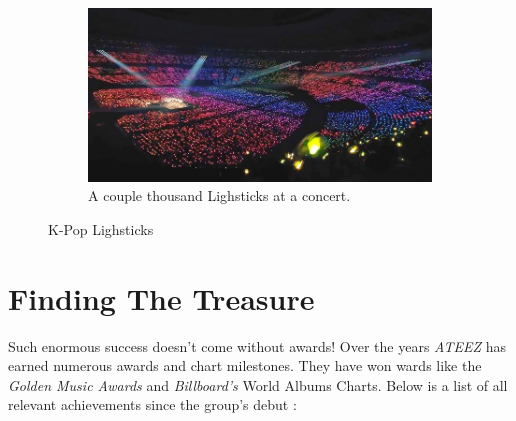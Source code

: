 \documentclass[a4paper,12pt]{article}
\begin{document}
\begin{figure}[H]
  \hfill
  \begin{subfigure}[t]{0.6\textwidth}
    \includegraphics[width=\textwidth]{images/ateez_lighsticks_concert.jpg}
    \caption{A couple thousand Lighsticks at a concert.}
    \label{fig:f2}
  \end{subfigure}
  \caption{K-Pop Lighsticks}
\end{figure}

\section{Finding The Treasure}
Such enormous success doesn't come without awards! Over the years \textit{ATEEZ} has earned numerous awards and chart milestones. They have won wards like the \textit{Golden Music Awards} and \textit{Billboard's} World Albums Charts. Below is a list of all relevant achievements since the group's debut \cite{ateezwiki} \cite{ateezawards}:\\
\end{document}
